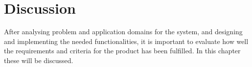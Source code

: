 \chapter{Discussion}\label{ch:discussion}
After analysing problem and application domains for the system, and designing and implementing the needed functionalities, it is important to evaluate how well the requirements and criteria for the product has been fulfilled. In this chapter these will be discussed. 

